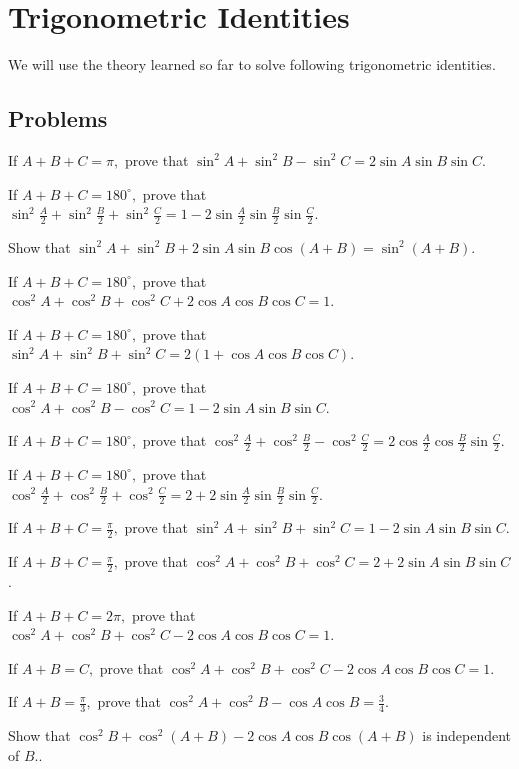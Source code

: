 \chapter{Trigonometric Identities}
We will use the theory learned so far to solve following trigonometric identities.

\section{Problems}
\startitemize[n, 1*broad]
\item If $A + B + C = \pi,$ prove that $\sin^2A + \sin^2B - \sin^2C = 2\sin A\sin B\sin C$.
\item If $A + B + C = 180^\circ,$ prove that $\sin^2\frac{A}{2} + \sin^2\frac{B}{2} + \sin^2\frac{C}{2} = 1 - 2\sin
  \frac{A}{2}\sin \frac{B}{2}\sin \frac{C}{2}$.
\item Show that $\sin^2A + \sin^2B + 2\sin A\sin B\cos(A + B) = \sin^2(A + B)$.
\item If $A + B + C = 180^\circ,$ prove that $\cos^2A + \cos^2B + \cos^2C + 2\cos A\cos B\cos C = 1$.
\item If $A + B + C = 180^\circ,$ prove that $\sin^2A + \sin^2B + \sin^2C = 2(1 + \cos A \cos B \cos C)$.
\item If $A + B + C = 180^\circ,$ prove that $\cos^2A + \cos^2B - \cos^2C = 1 - 2\sin A\sin B\sin C$.
\item If $A + B + C = 180^\circ,$ prove that $\cos^2\frac{A}{2} + \cos^2\frac{B}{2} - \cos^2\frac{C}{2} =
  2\cos\frac{A}{2}\cos\frac{B}{2}\sin\frac{C}{2}$.
\item If $A + B + C = 180^\circ,$ prove that $\cos^2\frac{A}{2} + \cos^2\frac{B}{2} + \cos^2\frac{C}{2} = 2 +
  2\sin\frac{A}{2}\sin\frac{B}{2}\sin\frac{C}{2}$.
\item If $A + B + C = \frac{\pi}{2},$ prove that $\sin^2A + \sin^2B + \sin^2C = 1 - 2\sin A\sin B\sin C$.
\item If $A + B + C = \frac{\pi}{2},$ prove that $\cos^2A + \cos^2B + \cos^2C = 2 + 2\sin A\sin B\sin C$.
\item If $A + B + C = 2\pi,$ prove that $\cos^2A + \cos^2B + \cos^2C - 2\cos A\cos B\cos C = 1$.
\item If $A + B = C,$ prove that $\cos^2A + \cos^2B + \cos^2C - 2\cos A\cos B\cos C = 1$.
\item If $A + B = \frac{\pi}{3},$ prove that $\cos^2A + \cos^2B - \cos A\cos B = \frac{3}{4}$.
\item Show that $\cos^2B + \cos^2(A + B) - 2\cos A\cos B\cos(A + B)$ is independent of $B.$.
